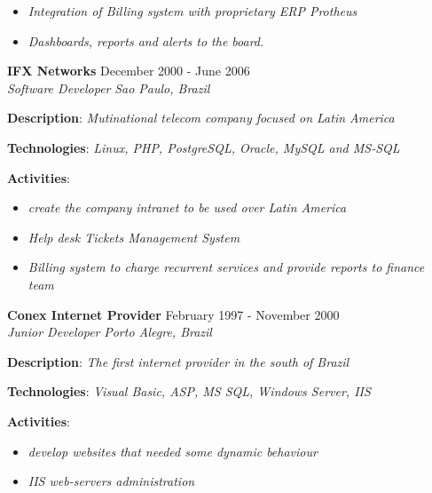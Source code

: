 \documentclass[margin]{res}
\begin{document}
\begin{resume}
\begin{description}
{\begin{itemize}
              \item{\textit{Integration of Billing system with proprietary ERP Protheus}}
              \item{\textit{Dashboards, reports and alerts to the board.}}
            \end{itemize}
    }
      \end{description}
    \textbf{IFX Networks} \hfill {December 2000 - June 2006}\\
  \textit{Software Developer} \hfill \textit{Sao Paulo, Brazil}\\
  \begin{description}
    \item{\textbf{Description}: \textit{Mutinational telecom company focused on Latin America}}
    \item{\textbf{Technologies}: \textit{Linux, PHP, PostgreSQL, Oracle, MySQL and MS-SQL}}
    \item{
      \textbf{Activities}:
      \begin{itemize}
              \item{\textit{create the company intranet to be used over Latin America}}
              \item{\textit{Help desk Tickets Management System}}
              \item{\textit{Billing system to charge recurrent services and provide reports to finance team}}
            \end{itemize}
    }
      \end{description}
    \textbf{Conex Internet Provider} \hfill {February 1997 - November 2000}\\
  \textit{Junior Developer} \hfill \textit{Porto Alegre, Brazil}\\
  \begin{description}
    \item{\textbf{Description}: \textit{The first internet provider in the south of Brazil}}
    \item{\textbf{Technologies}: \textit{Visual Basic, ASP, MS SQL, Windows Server, IIS}}
    \item{
      \textbf{Activities}:
      \begin{itemize}
              \item{\textit{develop websites that needed some dynamic behaviour}}
              \item{\textit{IIS web-servers administration}}
            \end{itemize}
    }
      \end{description}
  

\end{resume}
\end{document}
